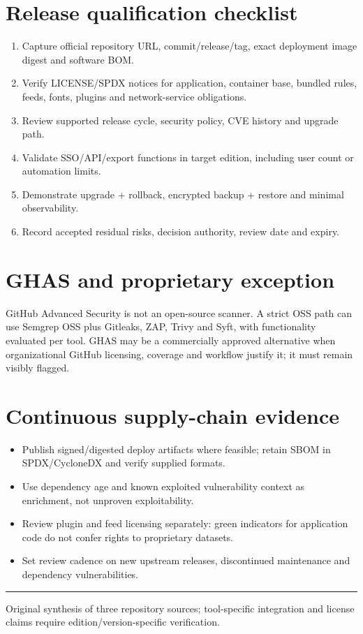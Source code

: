 \documentclass[10pt,letterpaper]{article}
\begin{document}
\section{Release qualification checklist}
\begin{enumerate}
\item Capture official repository URL, commit/release/tag, exact deployment image digest and software BOM.
\item Verify LICENSE/SPDX notices for application, container base, bundled rules, feeds, fonts, plugins and network-service obligations.
\item Review supported release cycle, security policy, CVE history and upgrade path.
\item Validate SSO/API/export functions in target edition, including user count or automation limits.
\item Demonstrate upgrade + rollback, encrypted backup + restore and minimal observability.
\item Record accepted residual risks, decision authority, review date and expiry.
\end{enumerate}
\section{GHAS and proprietary exception}
GitHub Advanced Security is not an open-source scanner. A strict OSS path can use Semgrep OSS plus Gitleaks, ZAP, Trivy and Syft, with functionality evaluated per tool. GHAS may be a commercially approved alternative when organizational GitHub licensing, coverage and workflow justify it; it must remain visibly flagged.\par
\section{Continuous supply-chain evidence}
\begin{itemize}
\item Publish signed/digested deploy artifacts where feasible; retain SBOM in SPDX/CycloneDX and verify supplied formats.
\item Use dependency age and known exploited vulnerability context as enrichment, not unproven exploitability.
\item Review plugin and feed licensing separately: green indicators for application code do not confer rights to proprietary datasets.
\item Set review cadence on new upstream releases, discontinued maintenance and dependency vulnerabilities.
\end{itemize}
\vfill\noindent\color{muted}\rule{\linewidth}{0.4pt}\par\scriptsize Original synthesis of three repository sources; tool-specific integration and license claims require edition/version-specific verification.\normalsize
\end{document}
